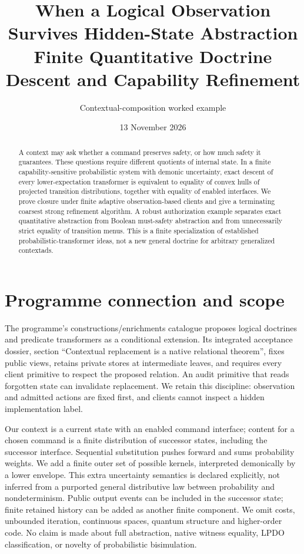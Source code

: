 \documentclass[11pt]{article}
\title{When a Logical Observation Survives Hidden-State Abstraction\\Finite Quantitative Doctrine Descent and Capability Refinement}
\author{Contextual-composition worked example}\date{13 November 2026}
\begin{document}
\maketitle
\begin{abstract}
A context may ask whether a command preserves safety, or how much safety it guarantees. These questions require different quotients of internal state. In a finite capability-sensitive probabilistic system with demonic uncertainty, exact descent of every lower-expectation transformer is equivalent to equality of convex hulls of projected transition distributions, together with equality of enabled interfaces. We prove closure under finite adaptive observation-based clients and give a terminating coarsest strong refinement algorithm. A robust authorization example separates exact quantitative abstraction from Boolean must-safety abstraction and from unnecessarily strict equality of transition menus. This is a finite specialization of established probabilistic-transformer ideas, not a new general doctrine for arbitrary generalized contextads.
\end{abstract}
\section{Programme connection and scope}
The programme's constructions/enrichments catalogue proposes logical doctrines and predicate transformers as a conditional extension. Its integrated acceptance dossier, section ``Contextual replacement is a native relational theorem'', fixes public views, retains private stores at intermediate leaves, and requires every client primitive to respect the proposed relation. An audit primitive that reads forgotten state can invalidate replacement. We retain this discipline: observation and admitted actions are fixed first, and clients cannot inspect a hidden implementation label.

Our context is a current state with an enabled command interface; content for a chosen command is a finite distribution of successor states, including the successor interface. Sequential substitution pushes forward and sums probability weights. We add a finite outer set of possible kernels, interpreted demonically by a lower envelope. This extra uncertainty semantics is declared explicitly, not inferred from a purported general distributive law between probability and nondeterminism. Public output events can be included in the successor state; finite retained history can be added as another finite component. We omit costs, unbounded iteration, continuous spaces, quantum structure and higher-order code. No claim is made about full abstraction, native witness equality, LPDO classification, or novelty of probabilistic bisimulation.
\end{document}
